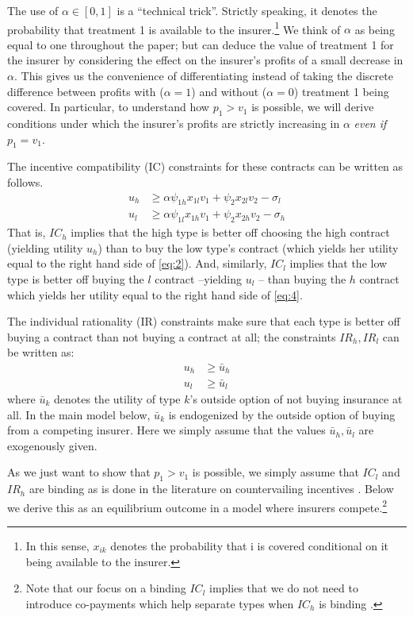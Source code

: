 \documentclass[a4paper,12pt]{article}
\begin{document}
The use of \(\alpha \in [0,1]\) is a ``technical trick''. Strictly speaking, it denotes the probability that treatment 1 is available to the insurer.\footnote{In this sense, \(x_{ik}\) denotes the probability that i is covered conditional on it being available to the insurer.} We think of \(\alpha\) as being equal to one throughout the paper; but can deduce the value of treatment 1 for the insurer by considering the effect on the insurer's profits of a small decrease in \(\alpha\). This gives us the convenience of differentiating instead of taking the discrete difference between profits with (\(\alpha=1\)) and without (\(\alpha=0\)) treatment 1 being covered. In particular, to understand how \(p_1 > v_1\) is possible, we will derive conditions under which the insurer's profits are strictly increasing in \(\alpha\) \emph{even if} \(p_1 = v_1\).

The incentive compatibility (IC) constraints for these contracts can be written as follows.
\begin{align}
\label{eq:2}
u_h &\geq  \alpha \psi_{1h} x_{1l} v_1 + \psi_{2} x_{2l} v_2 - \sigma_{l} \\
\label{eq:4}
u_l &\geq   \alpha \psi_{1l} x_{1h} v_1 + \psi_{2} x_{2h} v_2 - \sigma_h
\end{align}
That is, \(IC_h\) implies that the high type is better off choosing the high contract (yielding utility \(u_h\)) than to buy the low type's contract (which yields her utility equal to the right hand side of \eqref{eq:2}). And, similarly, \(IC_l\) implies that the low type is better off buying the \(l\) contract --yielding \(u_l\) -- than buying the \(h\) contract which yields her utility equal to the right hand side of \eqref{eq:4}.

The individual rationality (IR) constraints make sure that each type is better off buying a contract than not buying a contract at all; the constraints \(IR_h, IR_l\) can be written as:
\begin{align}
\label{eq:2IR}
u_h &\geq  \bar u_h \\
\label{eq:4IR}
u_l &\geq  \bar u_l
\end{align}
where \(\bar u_k\) denotes the utility of type \(k\)'s outside option of not buying insurance at all. In the main model below, \(\bar u_k\) is endogenized by the outside option of buying from a competing insurer. Here we simply assume that the values \(\bar u_h, \bar u_l\) are exogenously given.

As we just want to show that \(p_1 > v_1\) is possible, we simply assume that \(IC_l\) and \(IR_h\) are binding as is done in the literature on countervailing incentives \citep{LEWIS1989294}. Below we derive this as an equilibrium outcome in a model where insurers compete.\footnote{Note that our focus on a binding \(IC_l\) implies that we do not need to introduce co-payments which help separate types when \(IC_h\) is binding \citep{rot76}.}
\end{document}
